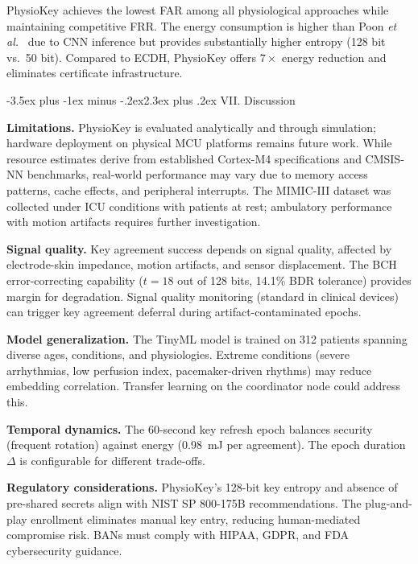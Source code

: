 \documentclass[10pt,twocolumn]{article}
\makeatletter
\renewcommand{\section}{\@startsection{section}{1}{\z@}%
  {-3.5ex plus -1ex minus -.2ex}{2.3ex plus .2ex}%
  {\normalfont\large\bfseries\centering}}
\newcommand{\etal}{\textit{et al.}}
\makeatother
\begin{document}
PhysioKey achieves the lowest FAR among all physiological approaches while maintaining competitive FRR. The energy consumption is higher than Poon \etal~\cite{poon2006novel} due to CNN inference but provides substantially higher entropy (128 bit vs.\ 50 bit). Compared to ECDH, PhysioKey offers $7\times$ energy reduction and eliminates certificate infrastructure.


\section{VII. Discussion}
\label{sec:discussion}

\textbf{Limitations.} PhysioKey is evaluated analytically and through simulation; hardware deployment on physical MCU platforms remains future work. While resource estimates derive from established Cortex-M4 specifications and CMSIS-NN benchmarks, real-world performance may vary due to memory access patterns, cache effects, and peripheral interrupts. The MIMIC-III dataset was collected under ICU conditions with patients at rest; ambulatory performance with motion artifacts requires further investigation.

\textbf{Signal quality.} Key agreement success depends on signal quality, affected by electrode-skin impedance, motion artifacts, and sensor displacement. The BCH error-correcting capability ($t = 18$ out of 128 bits, 14.1\% BDR tolerance) provides margin for degradation. Signal quality monitoring (standard in clinical devices) can trigger key agreement deferral during artifact-contaminated epochs.

\textbf{Model generalization.} The TinyML model is trained on 312 patients spanning diverse ages, conditions, and physiologies. Extreme conditions (severe arrhythmias, low perfusion index, pacemaker-driven rhythms) may reduce embedding correlation. Transfer learning on the coordinator node could address this.

\textbf{Temporal dynamics.} The 60-second key refresh epoch balances security (frequent rotation) against energy (0.98~mJ per agreement). The epoch duration $\Delta$ is configurable for different trade-offs.

\textbf{Regulatory considerations.} PhysioKey's 128-bit key entropy and absence of pre-shared secrets align with NIST SP 800-175B recommendations. The plug-and-play enrollment eliminates manual key entry, reducing human-mediated compromise risk. BANs must comply with HIPAA, GDPR, and FDA cybersecurity guidance.
\end{document}
